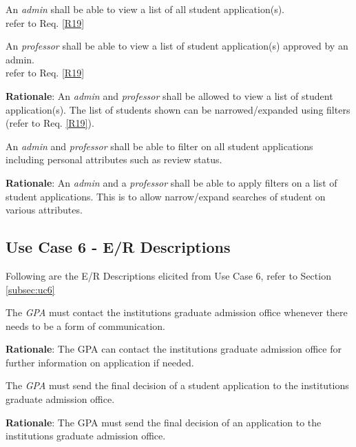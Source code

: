 \documentclass[fontsize=12pt,paper=letter,twoside]{scrartcl}
\begin{document}
\rdescription
{An \emph{admin} shall be able to view a list of all student application(s).\\}
{refer to Req. \ref{R19}}
\label{R17}

\rdescription
{An \emph{professor} shall be able to view a list of student application(s) approved by an admin.\\}
{refer to Req. \ref{R19}}
\label{R18}

\smallskip
\noindent \textbf{Rationale}: An \emph{admin} and \emph{professor} shall be allowed to view a list of student application(s). The list of students shown can be narrowed/expanded using filters (refer to Req. \ref{R19}).

\genreq
{An \emph{admin} and \emph{professor} shall be able to filter on all student applications including personal attributes such as review status.\\}
{}
\label{R19}

\smallskip
\noindent \textbf{Rationale}: An \emph{admin} and a \emph{professor} shall be able to apply filters on a list of student applications. This is to allow narrow/expand searches of student on various attributes.

\subsection{Use Case 6 - E/R Descriptions}

Following are the E/R Descriptions elicited from Use Case 6, refer to Section \ref{subsec:uc6}

\genenv
{The \emph{GPA} must contact the institutions graduate admission office whenever there needs to be a form of communication. \\}
{}
\label{E4}

\smallskip
\noindent \textbf{Rationale}: The GPA can contact the institutions graduate admission office for further information on application if needed.

\genenv
{The \emph{GPA} must send the final decision of a student application to the institutions graduate admission office. \\}
{}
\label{E5}

\smallskip
\noindent \textbf{Rationale}: The GPA must send the final decision of an application to the institutions graduate admission office.
\end{document}
